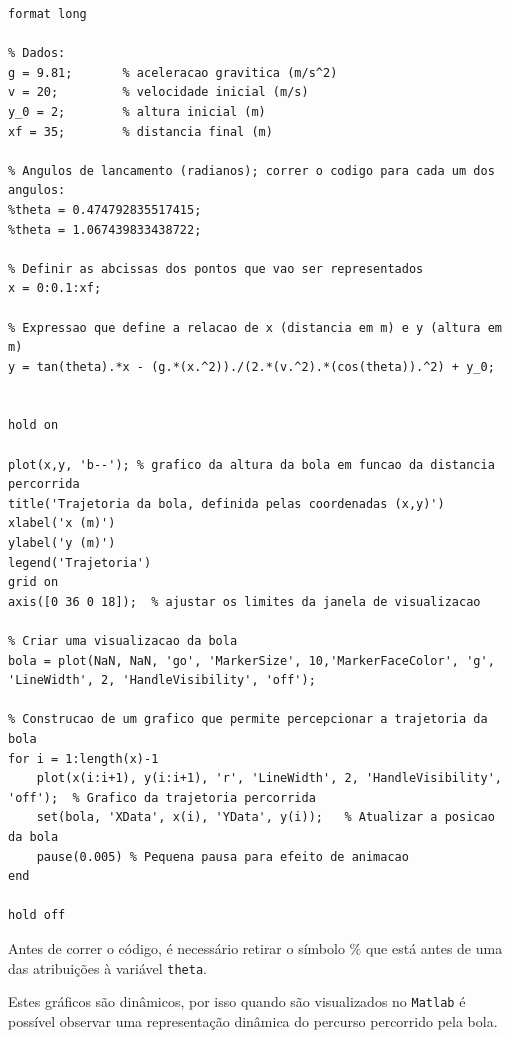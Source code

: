 \documentclass[12pt,a4paper]{article}
\begin{document}
\begin{lstlisting}
format long

% Dados:
g = 9.81;       % aceleracao gravitica (m/s^2)
v = 20;         % velocidade inicial (m/s)
y_0 = 2;        % altura inicial (m)
xf = 35;        % distancia final (m)

% Angulos de lancamento (radianos); correr o codigo para cada um dos angulos:
%theta = 0.474792835517415;
%theta = 1.067439833438722;

% Definir as abcissas dos pontos que vao ser representados
x = 0:0.1:xf;

% Expressao que define a relacao de x (distancia em m) e y (altura em m)
y = tan(theta).*x - (g.*(x.^2))./(2.*(v.^2).*(cos(theta)).^2) + y_0;


hold on

plot(x,y, 'b--'); % grafico da altura da bola em funcao da distancia                  percorrida
title('Trajetoria da bola, definida pelas coordenadas (x,y)')
xlabel('x (m)')
ylabel('y (m)')
legend('Trajetoria')
grid on
axis([0 36 0 18]);  % ajustar os limites da janela de visualizacao

% Criar uma visualizacao da bola
bola = plot(NaN, NaN, 'go', 'MarkerSize', 10,'MarkerFaceColor', 'g', 'LineWidth', 2, 'HandleVisibility', 'off');

% Construcao de um grafico que permite percepcionar a trajetoria da bola
for i = 1:length(x)-1
    plot(x(i:i+1), y(i:i+1), 'r', 'LineWidth', 2, 'HandleVisibility', 'off');  % Grafico da trajetoria percorrida
    set(bola, 'XData', x(i), 'YData', y(i));   % Atualizar a posicao                                           da bola
    pause(0.005) % Pequena pausa para efeito de animacao
end

hold off
\end{lstlisting}

\noindent Antes de correr o código, é necessário retirar o símbolo \(\%\) que está antes de uma das atribuições à variável \texttt{theta}.

\noindent Estes gráficos são dinâmicos, por isso quando são visualizados no \texttt{Matlab} é possível observar uma representação dinâmica do percurso percorrido pela bola.
\end{document}
